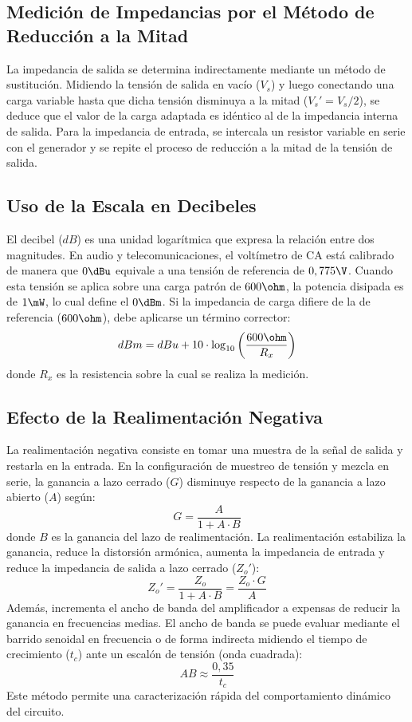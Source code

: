 \subsection{Medición de Impedancias por el Método de Reducción a la Mitad}
La impedancia de salida se determina indirectamente mediante un método de sustitución. Midiendo la tensión de
salida en vacío ($V_s$) y luego conectando una carga variable hasta que dicha tensión disminuya a la mitad
($V_s' = V_s/2$), se deduce que el valor de la carga adaptada es idéntico al de la impedancia interna de salida.
Para la impedancia de entrada, se intercala un resistor variable en serie con el generador y se repite el proceso
de reducción a la mitad de la tensión de salida.

\subsection{Uso de la Escala en Decibeles}
El decibel ($dB$) es una unidad logarítmica que expresa la relación entre dos magnitudes. En audio y telecomunicaciones,
el voltímetro de CA está calibrado de manera que $0\dBu$ equivale a una tensión de referencia de $0,775\V$. Cuando esta
tensión se aplica sobre una carga patrón de $600\ohm$, la potencia disipada es de $1\mW$, lo cual define el $0\dBm$.
Si la impedancia de carga difiere de la de referencia ($600\ohm$), debe aplicarse un término corrector:
\begin{equation}
    dBm = dBu + 10 \cdot \log_{10} \left( \frac{600\ohm}{R_x} \right)
\end{equation}
donde $R_x$ es la resistencia sobre la cual se realiza la medición.

\subsection{Efecto de la Realimentación Negativa}
La realimentación negativa consiste en tomar una muestra de la señal de salida y restarla en la entrada.
En la configuración de muestreo de tensión y mezcla en serie, la ganancia a lazo cerrado ($G$) disminuye respecto
de la ganancia a lazo abierto ($A$) según:
\begin{equation}
    G = \frac{A}{1 + A \cdot B}
\end{equation}
donde $B$ es la ganancia del lazo de realimentación. La realimentación estabiliza la ganancia, reduce la
distorsión armónica, aumenta la impedancia de entrada y reduce la impedancia de salida a lazo cerrado ($Z_o'$):
\begin{equation}
    Z_o' = \frac{Z_o}{1 + A \cdot B} = \frac{Z_o \cdot G}{A}
\end{equation}
Además, incrementa el ancho de banda del amplificador a expensas de reducir la ganancia en frecuencias medias.
El ancho de banda se puede evaluar mediante el barrido senoidal en frecuencia o de forma indirecta midiendo el
tiempo de crecimiento ($t_c$) ante un escalón de tensión (onda cuadrada):
\begin{equation}
    AB \approx \frac{0,35}{t_c}
\end{equation}
Este método permite una caracterización rápida del comportamiento dinámico del circuito.
